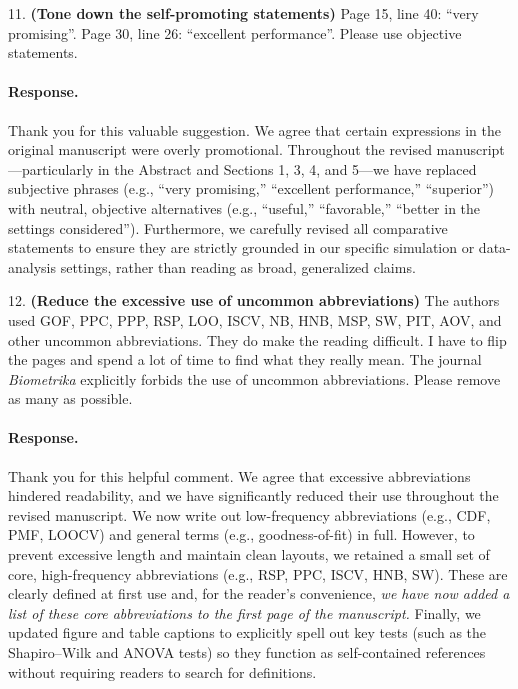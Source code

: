 \documentclass[11pt]{article}
\newcommand*{\mybox}[2]{\colorbox{#1!30}{\parbox{.98\linewidth}{#2}}}
\begin{document}
\medskip

\mybox{gray}{11. \textbf{(Tone down the self-promoting statements)} Page 15, line 40: ``very promising''. Page 30, line 26: ``excellent performance''. Please use objective statements.}

\paragraph{Response.}
Thank you for this valuable suggestion. We agree that certain expressions in the original manuscript were overly promotional. Throughout the revised manuscript---particularly in the Abstract and Sections 1, 3, 4, and 5---we have replaced subjective phrases (e.g., ``very promising,'' ``excellent performance,'' ``superior'') with neutral, objective alternatives (e.g., ``useful,'' ``favorable,'' ``better in the settings considered''). Furthermore, we carefully revised all comparative statements to ensure they are strictly grounded in our specific simulation or data-analysis settings, rather than reading as broad, generalized claims.
\medskip

\mybox{gray}{12. \textbf{(Reduce the excessive use of uncommon abbreviations)} The authors used GOF, PPC, PPP, RSP, LOO, ISCV, NB, HNB, MSP, SW, PIT, AOV, and other uncommon abbreviations. They do make the reading difficult. I have to flip the pages and spend a lot of time to find what they really mean. The journal \textit{Biometrika} explicitly forbids the use of uncommon abbreviations. Please remove as many as possible.}

\paragraph{Response.}


Thank you for this helpful comment. We agree that excessive abbreviations hindered readability, and we have significantly reduced their use throughout the revised manuscript. We now write out low-frequency abbreviations (e.g., CDF, PMF, LOOCV) and general terms (e.g., goodness-of-fit) in full. However, to prevent excessive length and maintain clean layouts, we retained a small set of core, high-frequency abbreviations (e.g., RSP, PPC, ISCV, HNB, SW). These are clearly defined at first use and, for the reader's convenience, \textit{we have now added a list of these core abbreviations to the first page of the manuscript.} Finally, we updated figure and table captions to explicitly spell out key tests (such as the Shapiro--Wilk and ANOVA tests) so they function as self-contained references without requiring readers to search for definitions.

\setlength{\bibsep}{0.2em}


\end{document}
